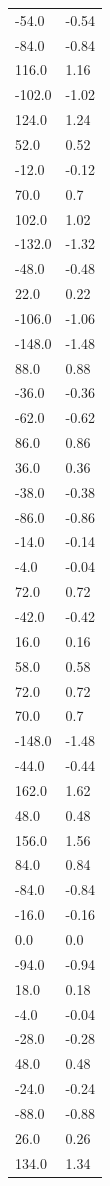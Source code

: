 \begin{longtable}{ll}
-54.0 & -0.54 \\
-84.0 & -0.84 \\
116.0 & 1.16 \\
-102.0 & -1.02 \\
124.0 & 1.24 \\
52.0 & 0.52 \\
-12.0 & -0.12 \\
70.0 & 0.7 \\
102.0 & 1.02 \\
-132.0 & -1.32 \\
-48.0 & -0.48 \\
22.0 & 0.22 \\
-106.0 & -1.06 \\
-148.0 & -1.48 \\
88.0 & 0.88 \\
-36.0 & -0.36 \\
-62.0 & -0.62 \\
86.0 & 0.86 \\
36.0 & 0.36 \\
-38.0 & -0.38 \\
-86.0 & -0.86 \\
-14.0 & -0.14 \\
-4.0 & -0.04 \\
72.0 & 0.72 \\
-42.0 & -0.42 \\
16.0 & 0.16 \\
58.0 & 0.58 \\
72.0 & 0.72 \\
70.0 & 0.7 \\
-148.0 & -1.48 \\
-44.0 & -0.44 \\
162.0 & 1.62 \\
48.0 & 0.48 \\
156.0 & 1.56 \\
84.0 & 0.84 \\
-84.0 & -0.84 \\
-16.0 & -0.16 \\
0.0 & 0.0 \\
-94.0 & -0.94 \\
18.0 & 0.18 \\
-4.0 & -0.04 \\
-28.0 & -0.28 \\
48.0 & 0.48 \\
-24.0 & -0.24 \\
-88.0 & -0.88 \\
26.0 & 0.26 \\
134.0 & 1.34 \\

\end{longtable}
